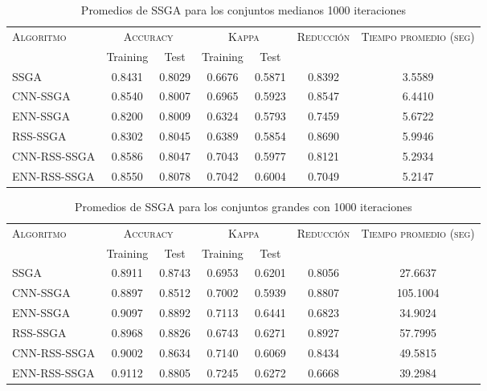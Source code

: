 \begin{table}[]
\centering
\begin{tabular}{l c c c c c c}
\hline
\multirow{2}{*}{\textsc{Algoritmo}}
	& \multicolumn{2}{c}{\textsc{Accuracy}}
	& \multicolumn{2}{c}{\textsc{Kappa}}
	& \textsc{Reducción}
	& \textsc{Tiempo promedio (seg)} \\
	& Training & Test
	& Training & Test \\ 
\hline
\hline

SSGA & 0.8431 & 0.8029 & 0.6676 & 0.5871 & 0.8392 & 3.5589 \\
CNN-SSGA & 0.8540 & 0.8007 & 0.6965 & 0.5923 & 0.8547 & 6.4410 \\
ENN-SSGA & 0.8200 & 0.8009 & 0.6324 & 0.5793 & 0.7459 & 5.6722 \\
RSS-SSGA & 0.8302 & 0.8045 & 0.6389 & 0.5854 & 0.8690 & 5.9946 \\
CNN-RSS-SSGA & 0.8586 & 0.8047 & 0.7043 & 0.5977 & 0.8121 & 5.2934 \\
ENN-RSS-SSGA & 0.8550 & 0.8078 & 0.7042 & 0.6004 & 0.7049 & 5.2147 \\

\hline
\end{tabular}
\caption{Promedios de SSGA para los conjuntos medianos 1000 iteraciones}
\label{med-ssga}
\end{table}

\begin{table}[]
\centering
\begin{tabular}{l c c c c c c}
\hline
\multirow{2}{*}{\textsc{Algoritmo}}
	& \multicolumn{2}{c}{\textsc{Accuracy}}
	& \multicolumn{2}{c}{\textsc{Kappa}}
	& \textsc{Reducción}
	& \textsc{Tiempo promedio (seg)} \\
	& Training & Test
	& Training & Test \\ 
\hline
\hline

SSGA & 0.8911 & 0.8743 & 0.6953 & 0.6201 & 0.8056 & 27.6637 \\
CNN-SSGA & 0.8897 & 0.8512 & 0.7002 & 0.5939 & 0.8807 & 105.1004 \\
ENN-SSGA & 0.9097 & 0.8892 & 0.7113 & 0.6441 & 0.6823 & 34.9024 \\
RSS-SSGA & 0.8968 & 0.8826 & 0.6743 & 0.6271 & 0.8927 & 57.7995 \\
CNN-RSS-SSGA & 0.9002 & 0.8634 & 0.7140 & 0.6069 & 0.8434 & 49.5815 \\
ENN-RSS-SSGA & 0.9112 & 0.8805 & 0.7245 & 0.6272 & 0.6668 & 39.2984 \\

\hline
\end{tabular}
\caption{Promedios de SSGA para los conjuntos grandes con 1000 iteraciones}
\label{grande-ssga}
\end{table}


